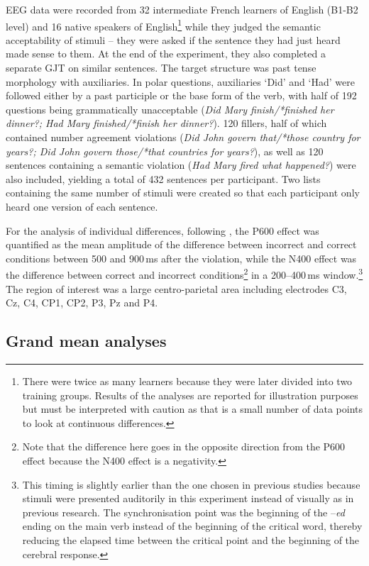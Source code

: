 \documentclass[output=paper,colorlinks,citecolor=brown,modfonts,nonflat]{../langscibook}
\begin{document}
EEG data were recorded from 32 intermediate French learners of English (B1-B2 level) and 16 native speakers of English\footnote{{There were twice as many learners because they were later divided into two training groups. Results of the analyses are reported for illustration purposes but must be interpreted with caution as that is a small number of data points to look at continuous differences.}} while they judged the semantic acceptability of stimuli – they were asked if the sentence they had just heard made sense to them. At the end of the experiment, they also completed a separate GJT on similar sentences. The target structure was past tense morphology with auxiliaries. In polar questions, auxiliaries ‘Did’ and ‘Had’ were followed either by a past participle or the base form of the verb, with half of 192 questions being grammatically unacceptable (\textit{Did Mary finish/*finished her dinner?; Had Mary finished/*finish her dinner?}). 120 fillers, half of which contained number agreement violations (\textit{Did John govern that/*those country for years?; Did John govern those/*that countries for years?}), as well as 120 sentences containing a semantic violation (\textit{Had Mary fired what happened?}) were also included, yielding a total of 432 sentences per participant. Two lists containing the same number of stimuli were created so that each participant only heard one version of each sentence.

For the analysis of individual differences, following \citet{TannerEtAl2014}, the P600 effect was quantified as the mean amplitude of the difference between incorrect and correct conditions between 500 and 900\,ms after the violation, while the N400 effect was the difference between correct and incorrect conditions\footnote{{Note that the difference here goes in the opposite direction from the P600 effect because the N400 effect is a negativity.}} in a 200--400\,ms window.\footnote{{This timing is slightly earlier than the one chosen in previous studies because stimuli were presented auditorily in this experiment instead of visually as in previous research. The synchronisation point was the beginning of the –}{\textit{ed}} {ending on the main verb instead of the beginning of the critical word, thereby reducing the elapsed time between the critical point and the beginning of the cerebral response.}} The region of interest was a large centro-parietal area including electrodes C3, Cz, C4, CP1, CP2, P3, Pz and P4.

\subsection{Grand mean analyses}
\end{document}
